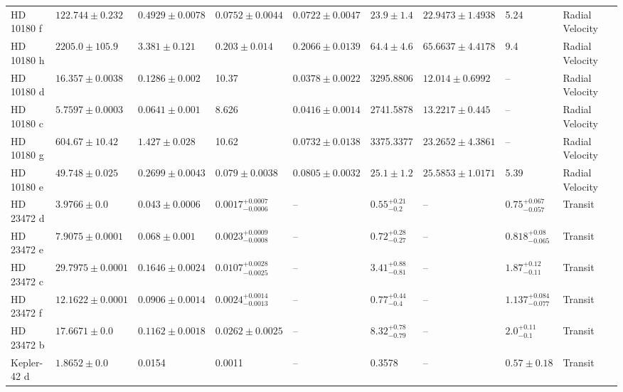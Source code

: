 \begin{tabular}{llllllllll}
HD 10180 f & $122.744 \pm 0.232$ & $0.4929 \pm 0.0078$ & $0.0752 \pm 0.0044$ & $0.0722 \pm 0.0047$ & $23.9 \pm 1.4$ & $22.9473 \pm 1.4938$ & 5.24 & Radial Velocity & \cite{KANE__AMP__GELINO_2014} \\
HD 10180 h & $2205.0 \pm 105.9$ & $3.381 \pm 0.121$ & $0.203 \pm 0.014$ & $0.2066 \pm 0.0139$ & $64.4 \pm 4.6$ & $65.6637 \pm 4.4178$ & 9.4 & Radial Velocity & \cite{KANE__AMP__GELINO_2014} \\
HD 10180 d & $16.357 \pm 0.0038$ & $0.1286 \pm 0.002$ & 10.37 & $0.0378 \pm 0.0022$ & 3295.8806 & $12.014 \pm 0.6992$ & -- & Radial Velocity & \cite{KANE__AMP__GELINO_2014} \\
HD 10180 c & $5.7597 \pm 0.0003$ & $0.0641 \pm 0.001$ & 8.626 & $0.0416 \pm 0.0014$ & 2741.5878 & $13.2217 \pm 0.445$ & -- & Radial Velocity & \cite{KANE__AMP__GELINO_2014} \\
HD 10180 g & $604.67 \pm 10.42$ & $1.427 \pm 0.028$ & 10.62 & $0.0732 \pm 0.0138$ & 3375.3377 & $23.2652 \pm 4.3861$ & -- & Radial Velocity & \cite{KANE__AMP__GELINO_2014} \\
HD 10180 e & $49.748 \pm 0.025$ & $0.2699 \pm 0.0043$ & $0.079 \pm 0.0038$ & $0.0805 \pm 0.0032$ & $25.1 \pm 1.2$ & $25.5853 \pm 1.0171$ & 5.39 & Radial Velocity & \cite{KANE__AMP__GELINO_2014} \\
HD 23472 d & $3.9766 \pm 0.0$ & $0.043 \pm 0.0006$ & $0.0017^{+0.0007}_{-0.0006}$ & -- & $0.55^{+0.21}_{-0.2}$ & -- & $0.75^{+0.067}_{-0.057}$ & Transit & \cite{BARROS_ET_AL_2022} \\
HD 23472 e & $7.9075 \pm 0.0001$ & $0.068 \pm 0.001$ & $0.0023^{+0.0009}_{-0.0008}$ & -- & $0.72^{+0.28}_{-0.27}$ & -- & $0.818^{+0.08}_{-0.065}$ & Transit & \cite{BARROS_ET_AL_2022} \\
HD 23472 c & $29.7975 \pm 0.0001$ & $0.1646 \pm 0.0024$ & $0.0107^{+0.0028}_{-0.0025}$ & -- & $3.41^{+0.88}_{-0.81}$ & -- & $1.87^{+0.12}_{-0.11}$ & Transit & \cite{BARROS_ET_AL_2022} \\
HD 23472 f & $12.1622 \pm 0.0001$ & $0.0906 \pm 0.0014$ & $0.0024^{+0.0014}_{-0.0013}$ & -- & $0.77^{+0.44}_{-0.4}$ & -- & $1.137^{+0.084}_{-0.077}$ & Transit & \cite{BARROS_ET_AL_2022} \\
HD 23472 b & $17.6671 \pm 0.0$ & $0.1162 \pm 0.0018$ & $0.0262 \pm 0.0025$ & -- & $8.32^{+0.78}_{-0.79}$ & -- & $2.0^{+0.11}_{-0.1}$ & Transit & \cite{BARROS_ET_AL_2022} \\
Kepler-42 d & $1.8652 \pm 0.0$ & 0.0154 & 0.0011 & -- & 0.3578 & -- & $0.57 \pm 0.18$ & Transit & \cite{MUIRHEAD_ET_AL__2012} \\

\end{tabular}
